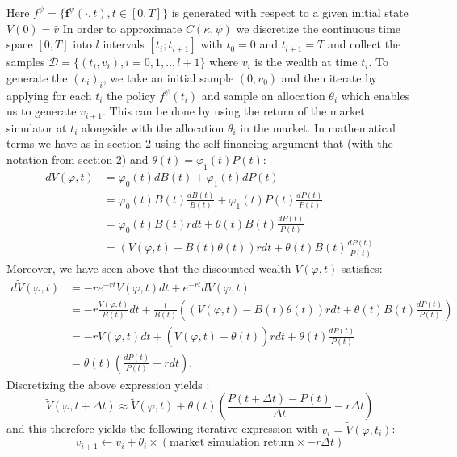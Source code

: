 \documentclass[oneside, a4paper, onecolumn, 11pt]{article}
\begin{document}
Here $f^{\psi}= \{\boldsymbol{f}^\psi(\cdot,t), t\in [0,T] \}$ is generated with respect to a given initial state $V(0) = \bar{v}$
 In order to approximate $C(\kappa,\psi)$ we discretize the continuous time space $[0,T]$ into $l$ intervals $[t_{i}; t_{i+1}]$ with $t_0=  0$ and $t_{l+1} = T$ and collect the samples $\mathcal{D}= \{(t_i, v_i), i= 0, 1, .., l+1\}$ where $v_i$ is the wealth at time $t_i$. To generate the $(v_i)_{i}$, we take an initial sample $(0, v_0)$ and then  iterate by applying for each $t_i$ the policy $f^\psi(t_i)$ and sample an allocation $\theta_i$ which enables us to generate $v_{i+1}$. This can be done by using the return of the market simulator at $t_i$ alongside with the allocation $\theta_i$ in the market. In mathematical terms we have as in section 2 using the self-financing argument  \cite{ZagstInvest} that (with the notation from section 2) and $\theta(t) = \varphi_1(t) \tilde{P}(t)$: 
\begin{align*}
  d{V}(\varphi,t) &= \varphi_0(t)dB(t) + \varphi_1(t)dP(t)\\
                  &= \varphi_0(t)B(t) \frac{dB(t)}{B(t)} + \varphi_1(t)P(t)\frac{dP(t)}{P(t)} \\
                  &= \varphi_0(t) B(t) rdt + \theta(t) B(t) \frac{dP(t)}{P(t)}\\
                  &= (V(\varphi,t) -B(t) \theta(t))rdt + \theta(t)B(t) \frac{dP(t)}{P(t)}
\end{align*}
Moreover, we have seen above that the discounted wealth $\tilde{V}(\varphi,t)$ satisfies:
\begin{align*}
   d\tilde{V}(\varphi,t) &= -re^{-rt}V(\varphi,t) dt + e^{-rt} dV(\varphi,t) \\
   &= -r\frac{V(\varphi,t)}{B(t)}dt + \frac{1}{B(t)}\left( (V(\varphi,t) - B(t)\theta(t))rdt + \theta(t) B(t)\frac{dP(t)}{P(t)} \right)\\
   &= -r\tilde{V}(\varphi,t)dt + (\tilde{V}(\varphi,t) - \theta(t))rdt + \theta(t) \frac{dP(t)}{P(t)}
\\
&= \theta(t) (\frac{dP(t)}{P(t)} -rdt).
\end{align*}
Discretizing the above expression yields : 
\begin{equation}
    \tilde{V}(\varphi,t+ \Delta t) \approx \tilde{V}(\varphi,t) + \theta(t) \left(\frac{P(t+\Delta t) - P(t)}{\Delta t} -r\Delta t \right)
\end{equation}
and this therefore yields the following iterative expression with $v_i = \tilde{V}(\varphi, t_i)$:
\begin{equation}
        v_{i+1} \leftarrow v_i +\theta_i\times (\text{market simulation return} \times -r\Delta t) 
\end{equation}
 
\end{document}
